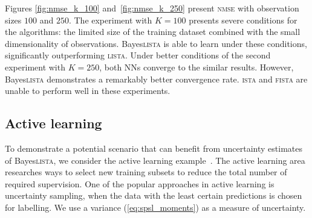 \documentclass{article}
\begin{document}
  Figures \ref{fig:nmse_k_100} and~\ref{fig:nmse_k_250} present \textsc{nmse} with observation sizes $100$ and $250$. The experiment with $K=100$ presents severe conditions for the algorithms: the limited size of the training dataset combined with the small dimensionality of observations. Bayes\textsc{lista} is able to learn under these conditions, significantly outperforming \textsc{lista}. Under better conditions of the second experiment with $K=250$, both NNs converge to the similar results. However, Bayes\textsc{lista} demonstrates a remarkably better convergence rate. \textsc{ista} and \textsc{fista} are unable to perform well in these experiments.
  
  
  \subsection{Active learning}
  To demonstrate a potential scenario that can benefit from uncertainty estimates of Bayes\textsc{lista}, we consider the active learning example~\cite{settles.tr09}. The active learning area researches ways to select new training subsets to reduce the total number of required supervision. One of the popular approaches in active learning is uncertainty sampling, when the data with the least certain predictions is chosen for labelling. We use a variance (\ref{eq:spsl_moments}) as a measure of uncertainty.
  
\end{document}
